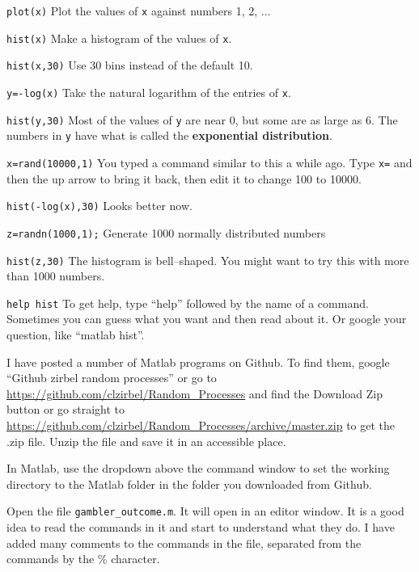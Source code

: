 \item {\tt plot(x)} \hfill Plot the values of {\tt x} against numbers 1, 2, ...
\item {\tt hist(x)} \hfill Make a histogram of the values of {\tt x}.
\item {\tt hist(x,30)} \hfill Use 30 bins instead of the default 10.
\item {\tt y=-log(x)} \hfill Take the natural logarithm of the entries of
{\tt x}.
\item {\tt hist(y,30)} \hfill Most of the values of {\tt y} are near 0, but
some are as large as 6.  The numbers in {\tt y} have what is called the
{\bf exponential distribution}.
\item {\tt x=rand(10000,1)} \hfill You typed a command similar to this a
while ago.  Type {\tt x=} and then the up arrow to bring it back, then edit
it to change 100 to 10000.
\item {\tt hist(-log(x),30)} \hfill Looks better now.
\item {\tt z=randn(1000,1);} \hfill Generate 1000 normally distributed numbers
\item {\tt hist(z,30)} \hfill The histogram is bell--shaped.  You might
want to try this with more than 1000 numbers.
\item {\tt help hist} \hfill To get help, type ``help'' followed by the name of a command.  Sometimes \new you can guess what you want and then read about it.  Or google your question, like ``matlab hist''.

\item I have posted a number of Matlab programs on Github.  To find them, google ``Github zirbel random processes'' or go to \url{https://github.com/clzirbel/Random\_Processes} and find the Download Zip button or go straight to \url{https://github.com/clzirbel/Random\_Processes/archive/master.zip} to get the .zip file.
Unzip the file and save it in an accessible place.

\item In Matlab, use the dropdown above the command window to set the working directory to the Matlab folder in the folder you downloaded from Github.

\item Open the file {\tt gambler\_outcome.m}.  It will open in an editor window.  It is a good idea to read the commands in it and start to understand what they do.  I have added many comments to the commands in the file, separated from the commands by the \% character.

